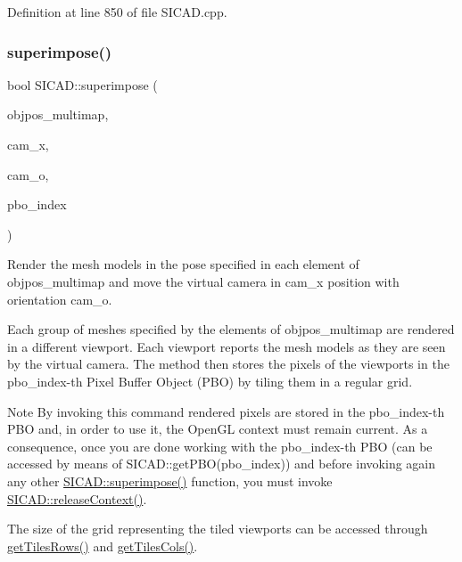 Definition at line 850 of file S\+I\+C\+A\+D.\+cpp.

\mbox{\label{classSICAD_acf0ea95ecb121c0b265ca52ac589d80f}} 
\subsubsection{\texorpdfstring{superimpose()}{superimpose()}\hspace{0.1cm}{\footnotesize\ttfamily [7/8]}}
{\footnotesize\ttfamily bool S\+I\+C\+A\+D\+::superimpose (\begin{DoxyParamCaption}\item[{const std\+::vector$<$ \mbox{\hyperlink{classSuperimpose_a178e3d4e2def6635bfcf9454dd4b5d22}{Model\+Pose\+Container}} $>$ \&}]{objpos\+\_\+multimap,  }\item[{const double $\ast$}]{cam\+\_\+x,  }\item[{const double $\ast$}]{cam\+\_\+o,  }\item[{const size\+\_\+t}]{pbo\+\_\+index }\end{DoxyParamCaption})\hspace{0.3cm}{\ttfamily [virtual]}}



Render the mesh models in the pose specified in each element of {\ttfamily objpos\+\_\+multimap} and move the virtual camera in {\ttfamily cam\+\_\+x} position with orientation {\ttfamily cam\+\_\+o}. 

Each group of meshes specified by the elements of {\ttfamily objpos\+\_\+multimap} are rendered in a different viewport. Each viewport reports the mesh models as they are seen by the virtual camera. The method then stores the pixels of the viewports in the {\ttfamily pbo\+\_\+index}-\/th Pixel Buffer Object (P\+BO) by tiling them in a regular grid.

\begin{DoxyNote}{Note}
By invoking this command rendered pixels are stored in the {\ttfamily pbo\+\_\+index}-\/th P\+BO and, in order to use it, the Open\+GL context must remain current. As a consequence, once you are done working with the {\ttfamily pbo\+\_\+index}-\/th P\+BO (can be accessed by means of {\ttfamily S\+I\+C\+A\+D\+::get\+P\+B\+O(pbo\+\_\+index)}) and before invoking again any other {\ttfamily \mbox{\hyperlink{classSICAD_a356e0ac8a0f130952a72326bedd4ab60}{S\+I\+C\+A\+D\+::superimpose()}}} function, you must invoke {\ttfamily \mbox{\hyperlink{classSICAD_ae626fa7f8fd4dc5fc4bdc4f5311beede}{S\+I\+C\+A\+D\+::release\+Context()}}}.

The size of the grid representing the tiled viewports can be accessed through {\ttfamily \mbox{\hyperlink{classSICAD_a9e3dd48dfd83ea0bd00d64dacc4fbd40}{get\+Tiles\+Rows()}}} and {\ttfamily \mbox{\hyperlink{classSICAD_a2ba3a0aeb3dab9996bdeed19a16eae56}{get\+Tiles\+Cols()}}}.
\end{DoxyNote}

